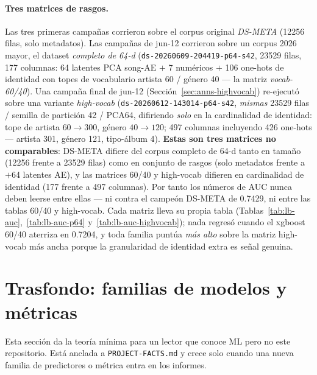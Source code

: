 \documentclass[11pt]{article}
\newcommand{\dsid}[1]{\texttt{\small #1}}
\begin{document}
\paragraph{Tres matrices de rasgos.} Las tres primeras campañas corrieron sobre
el corpus original \emph{DS-META} (\num{12256} filas, solo metadatos). Las
campañas de jun-12 corrieron sobre un corpus 2026 mayor, el dataset
\emph{completo de 64-d} (\dsid{ds-20260609-204419-p64-s42}, \num{23529} filas,
177 columnas: 64 latentes PCA song-AE $+$ 7 numéricos $+$ 106 one-hots de
identidad con topes de vocabulario artista 60 / género 40 --- la matriz
\emph{vocab-60/40}). Una campaña final de jun-12
(Sección~\ref{sec:anns-highvocab}) re-ejecutó sobre una variante
\emph{high-vocab} (\dsid{ds-20260612-143014-p64-s42}, \emph{mismas} \num{23529}
filas / semilla de partición 42 / PCA64, difiriendo \emph{solo} en la
cardinalidad de identidad: tope de artista $60\to300$, género $40\to120$; 497
columnas incluyendo 426 one-hots --- artista 301, género 121, tipo-álbum 4).
\textbf{Estas son tres matrices no comparables}: DS-META difiere del corpus
completo de 64-d tanto en tamaño (\num{12256} frente a \num{23529} filas) como
en conjunto de rasgos (solo metadatos frente a $+$64 latentes AE), y las
matrices 60/40 y high-vocab difieren en cardinalidad de identidad (177 frente a
497 columnas). Por tanto los números de AUC nunca deben leerse entre ellas ---
ni contra el campeón DS-META de \num{0.7429}, ni entre las tablas 60/40 y
high-vocab. Cada matriz lleva su propia tabla
(Tablas~\ref{tab:lb-auc},~\ref{tab:lb-auc-p64} y~\ref{tab:lb-auc-highvocab});
nada regresó cuando el xgboost 60/40 aterriza en \num{0.7204}, y toda familia
puntúa \emph{más alto} sobre la matriz high-vocab más ancha porque la
granularidad de identidad extra es señal genuina.

\section{Trasfondo: familias de modelos y métricas}
\label{sec:background}
Esta sección da la teoría mínima para un lector que conoce ML pero no este
repositorio. Está anclada a \texttt{PROJECT-FACTS.md} y crece solo cuando una
nueva familia de predictores o métrica entra en los informes.
\end{document}
